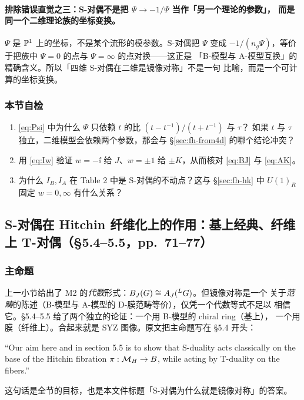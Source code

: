 \paragraph{排除错误直觉之三：S-对偶不是把 $\Psi\to-1/\Psi$ 当作「另一个理论的参数」，
而是同一个二维理论族的坐标变换。}
$\Psi$ 是 $\mathbb{P}^1$ 上的坐标，不是某个流形的模参数。S-对偶把 $\Psi$ 变成
$-1/(n_g\Psi)$，等价于把族中 $\Psi=0$ 的点与 $\Psi=\infty$ 的点对换——这正是
「B-模型与 A-模型互换」的精确含义。所以「四维 S-对偶在二维是镜像对称」不是一句
比喻，而是一个可计算的坐标变换。\pA{}

\subsubsection*{本节自检}
\begin{enumerate}
\item \eqref{eq:Psi} 中为什么 $\Psi$ 只依赖 $t$ 的比 $(t-t^{-1})/(t+t^{-1})$ 与 $\tau$？
如果 $t$ 与 $\tau$ 独立，二维模型会依赖两个参数，那会与 §\ref{sec:fh-from4d} 的哪个结论冲突？
\item 用 \eqref{eq:Iw} 验证 $w=-\ii$ 给 $J$、$w=\pm1$ 给 $\pm K$，从而核对
\eqref{eq:BJ} 与 \eqref{eq:AK}。
\item 为什么 $I_B,I_A$ 在 Table 2 中是 S-对偶的不动点？这与 §\ref{sec:fh-hk} 中
$U(1)_R$ 固定 $w=0,\infty$ 有什么关系？
\end{enumerate}

\subsection{S-对偶在 Hitchin 纤维化上的作用：基上经典、纤维上 T-对偶（§5.4--5.5，pp.~71--77）}
\label{sec:fh-s}

\subsubsection*{主命题}

上一小节给出了 M2 的\emph{代数}形式：$B_J(G)\cong A_J({}^{L}G)$。但镜像对称是一个
关于\emph{范畴}的陈述（B-模型与 A-模型的 D-膜范畴等价），仅凭一个代数等式不足以
相信它。§5.4--5.5 给了两个独立的论证：一个用 B-模型的 chiral ring（基上），
一个用膜（纤维上）。合起来就是 SYZ 图像。原文把主命题写在 §5.4 开头：\pA{}
\begin{origquote}
“Our aim here and in section 5.5 is to show that S-duality acts classically on the base of the Hitchin fibration $\pi:\mathcal{M}_H\to B$, while acting by T-duality on the fibers.” 
\end{origquote}
这句话是全节的目标，也是本文件标题「S-对偶为什么就是镜像对称」的答案。

